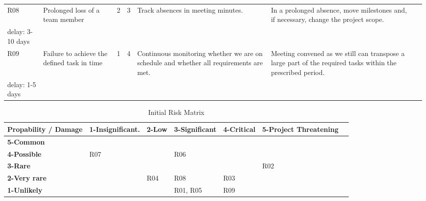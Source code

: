 \begin{center}
\begin{longtable}{L{5mm} L{40mm} C{5mm} C{5mm} C{5mm} L{30mm} L{70mm}}
	R08 & Prolonged loss of a team member  & 2 & 3 & Track absences in meeting minutes. & In a prolonged absence, move milestones and, if necessary, change the project scope.\\delay: 3-10 days \\ \hline
	R09 & Failure to achieve the defined task in time & 1 & 4 & Continuous monitoring whether we are on schedule and whether all requirements are met. & Meeting convened as we still can transpose a large part of the required tasks within the prescribed period.\\delay: 1-5 days \\ \hline
  \end{longtable}
\end{center}

\begin{table}[H]
  \centering
  \scriptsize
  \caption{Initial Risk Matrix}
  \begin{tabular}{|m{27mm}|m{20mm}|m{20mm}|m{20mm}|m{20mm}|m{20mm}|@{}m{0pt}@{}}
    \hline \bf Propability / Damage & \bf 1-Insignificant. & \bf 2-Low & \bf 3-Significant & \bf 4-Critical & \bf 5-Project Threatening & \\ [10pt]
    \hline \bf 5-Common & \cellcolor{yellow!50} & \cellcolor{yellow!50} & \cellcolor{red!50} & \cellcolor{red!50} &\cellcolor{red!50} & \\ [10pt]
    \hline \bf 4-Possible & \cellcolor{green!50} R07 & \cellcolor{yellow!50} & \cellcolor{yellow!50} R06 & \cellcolor{red!50} &\cellcolor{red!50} & \\ [10pt]
    \hline \bf 3-Rare &\cellcolor{green!50} & \cellcolor{green!50} & \cellcolor{yellow!50} & \cellcolor{yellow!50} &\cellcolor{red!50} R02 & \\ [10pt]
    \hline \bf 2-Very rare & \cellcolor{green!50} & \cellcolor{green!50} R04 & \cellcolor{green!50} R08 &\cellcolor{yellow!50} R03 &\cellcolor{yellow!50} & \\ [10pt]
    \hline \bf 1-Unlikely & \cellcolor{green!50} & \cellcolor{green!50} & \cellcolor{green!50} R01, R05 &\cellcolor{green!50} R09 &\cellcolor{yellow!50} & \\ [10pt]
    \hline
  \end{tabular} \\
\end{table}


